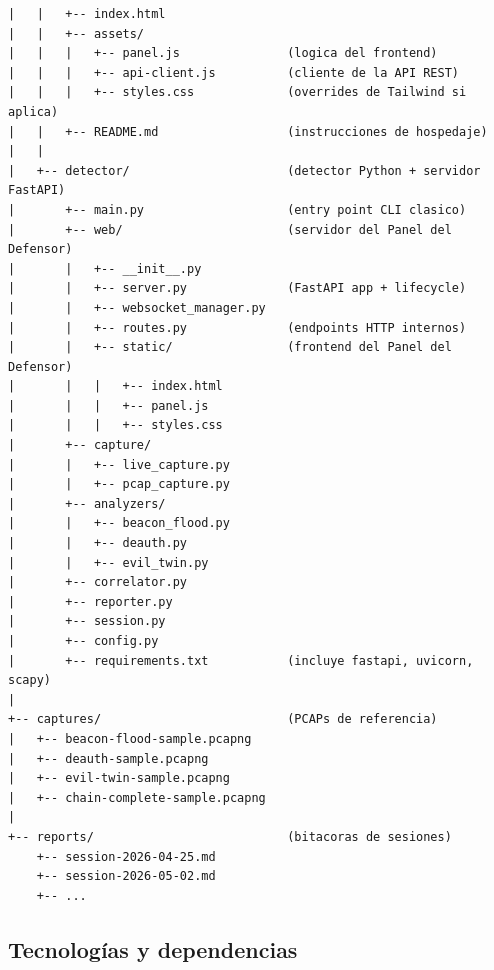 \documentclass[11pt,a4paper]{article}
\begin{document}
\begin{verbatim}
|   |   +-- index.html
|   |   +-- assets/
|   |   |   +-- panel.js               (logica del frontend)
|   |   |   +-- api-client.js          (cliente de la API REST)
|   |   |   +-- styles.css             (overrides de Tailwind si aplica)
|   |   +-- README.md                  (instrucciones de hospedaje)
|   |
|   +-- detector/                      (detector Python + servidor FastAPI)
|       +-- main.py                    (entry point CLI clasico)
|       +-- web/                       (servidor del Panel del Defensor)
|       |   +-- __init__.py
|       |   +-- server.py              (FastAPI app + lifecycle)
|       |   +-- websocket_manager.py
|       |   +-- routes.py              (endpoints HTTP internos)
|       |   +-- static/                (frontend del Panel del Defensor)
|       |   |   +-- index.html
|       |   |   +-- panel.js
|       |   |   +-- styles.css
|       +-- capture/
|       |   +-- live_capture.py
|       |   +-- pcap_capture.py
|       +-- analyzers/
|       |   +-- beacon_flood.py
|       |   +-- deauth.py
|       |   +-- evil_twin.py
|       +-- correlator.py
|       +-- reporter.py
|       +-- session.py
|       +-- config.py
|       +-- requirements.txt           (incluye fastapi, uvicorn, scapy)
|
+-- captures/                          (PCAPs de referencia)
|   +-- beacon-flood-sample.pcapng
|   +-- deauth-sample.pcapng
|   +-- evil-twin-sample.pcapng
|   +-- chain-complete-sample.pcapng
|
+-- reports/                           (bitacoras de sesiones)
    +-- session-2026-04-25.md
    +-- session-2026-05-02.md
    +-- ...
\end{verbatim}

\subsection{Tecnologías y dependencias}
\end{document}
